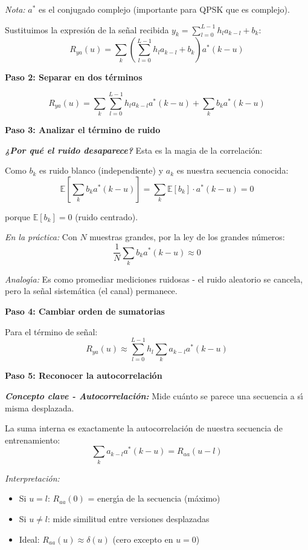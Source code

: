 \documentclass[11pt,a4paper]{article}
\begin{document}
\textit{Nota:} $a^*$ es el conjugado complejo (importante para QPSK que es complejo).

Sustituimos la expresi\'on de la se\~nal recibida $y_k = \sum_{l=0}^{L-1} h_l a_{k-l} + b_k$:
\[
R_{ya}(u) = \sum_k \left(\sum_{l=0}^{L-1} h_l a_{k-l} + b_k\right) a^*(k-u)
\]

\textbf{Paso 2: Separar en dos t\'erminos}

\[
R_{ya}(u) = \sum_k \sum_{l=0}^{L-1} h_l a_{k-l} a^*(k-u) + \sum_k b_k a^*(k-u)
\]

\textbf{Paso 3: Analizar el t\'ermino de ruido}

\textit{\textbf{¿Por qu\'e el ruido desaparece?}} Esta es la magia de la correlaci\'on:

Como $b_k$ es ruido blanco (independiente) y $a_k$ es nuestra secuencia conocida:
\[
\mathbb{E}\left[\sum_k b_k a^*(k-u)\right] = \sum_k \mathbb{E}[b_k] \cdot a^*(k-u) = 0
\]

porque $\mathbb{E}[b_k] = 0$ (ruido centrado).

\textit{En la pr\'actica:} Con $N$ muestras grandes, por la ley de los grandes n\'umeros:
\[
\frac{1}{N}\sum_k b_k a^*(k-u) \approx 0
\]

\textit{Analog\'{\i}a:} Es como promediar mediciones ruidosas - el ruido aleatorio se cancela, pero la se\~nal sistem\'atica (el canal) permanece.

\textbf{Paso 4: Cambiar orden de sumatorias}

Para el t\'ermino de se\~nal:
\[
R_{ya}(u) \approx \sum_{l=0}^{L-1} h_l \sum_k a_{k-l} a^*(k-u)
\]

\textbf{Paso 5: Reconocer la autocorrelaci\'on}

\textit{\textbf{Concepto clave - Autocorrelaci\'on:}} Mide cu\'anto se parece una secuencia a s\'{\i} misma desplazada.

La suma interna es exactamente la autocorrelaci\'on de nuestra secuencia de entrenamiento:
\[
\sum_k a_{k-l} a^*(k-u) = R_{aa}(u-l)
\]

\textit{Interpretaci\'on:}
\begin{itemize}
    \item Si $u = l$: $R_{aa}(0)$ = energ\'{\i}a de la secuencia (m\'aximo)
    \item Si $u \neq l$: mide similitud entre versiones desplazadas
    \item Ideal: $R_{aa}(u) \approx \delta(u)$ (cero excepto en $u=0$)
\end{itemize}
\end{document}
